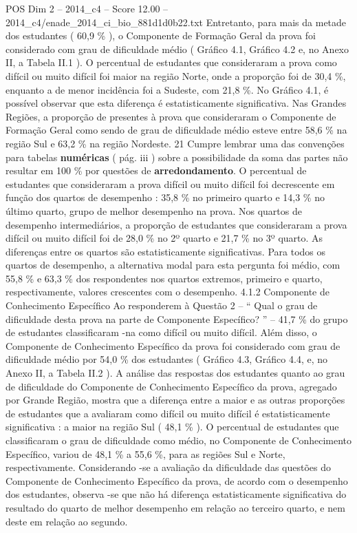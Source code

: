 \begin{textsample}{POS Dim 2 – 2014\_c4 – Score 12.00 – 2014\_c4/enade\_2014\_ci\_bio\_881d1d0b22.txt}
Entretanto, para mais da metade dos estudantes ( 60,9 \% ), o Componente de Formação Geral da prova foi considerado com grau de dificuldade médio ( Gráfico 4.1, Gráfico 4.2 e, no Anexo II, a Tabela II.1 ).
O percentual de estudantes que consideraram a prova como difícil ou muito difícil foi maior na região Norte, onde a proporção foi de 30,4 \%, enquanto a de menor incidência foi a Sudeste, com 21,8 \%.
No Gráfico 4.1, é possível observar que esta diferença é estatisticamente significativa.
Nas Grandes Regiões, a proporção de presentes à prova que consideraram o Componente de Formação Geral como sendo de grau de dificuldade médio esteve entre 58,6 \% na região Sul e 63,2 \% na região Nordeste. 21 Cumpre lembrar uma das convenções para tabelas \textbf{numéricas} ( pág. iii ) sobre a possibilidade da soma das partes não resultar em 100 \% por questões de \textbf{arredondamento}.
O percentual de estudantes que consideraram a prova difícil ou muito difícil foi decrescente em função dos quartos de desempenho : 35,8 \% no primeiro quarto e 14,3 \% no último quarto, grupo de melhor desempenho na prova.
Nos quartos de desempenho intermediários, a proporção de estudantes que consideraram a prova difícil ou muito difícil foi de 28,0 \% no 2º quarto e 21,7 \% no 3º quarto.
As diferenças entre os quartos são estatisticamente significativas.
Para todos os quartos de desempenho, a alternativa modal para esta pergunta foi médio, com 55,8 \% e 63,3 \% dos respondentes nos quartos extremos, primeiro e quarto, respectivamente, valores crescentes com o desempenho. 4.1.2 Componente de Conhecimento Específico Ao responderem à Questão 2 – “ Qual o grau de dificuldade desta prova na parte de Componente Específico? ” – 41,7 \% do grupo de estudantes classificaram -na como difícil ou muito difícil.
Além disso, o Componente de Conhecimento Específico da prova foi considerado com grau de dificuldade médio por 54,0 \% dos estudantes ( Gráfico 4.3, Gráfico 4.4, e, no Anexo II, a Tabela II.2 ).
A análise das respostas dos estudantes quanto ao grau de dificuldade do Componente de Conhecimento Específico da prova, agregado por Grande Região, mostra que a diferença entre a maior e as outras proporções de estudantes que a avaliaram como difícil ou muito difícil é estatisticamente significativa : a maior na região Sul ( 48,1 \% ).
O percentual de estudantes que classificaram o grau de dificuldade como médio, no Componente de Conhecimento Específico, variou de 48,1 \% a 55,6 \%, para as regiões Sul e Norte, respectivamente.
Considerando -se a avaliação da dificuldade das questões do Componente de Conhecimento Específico da prova, de acordo com o desempenho dos estudantes, observa -se que não há diferença estatisticamente significativa do resultado do quarto de melhor desempenho em relação ao terceiro quarto, e nem deste em relação ao segundo.

\end{textsample}
